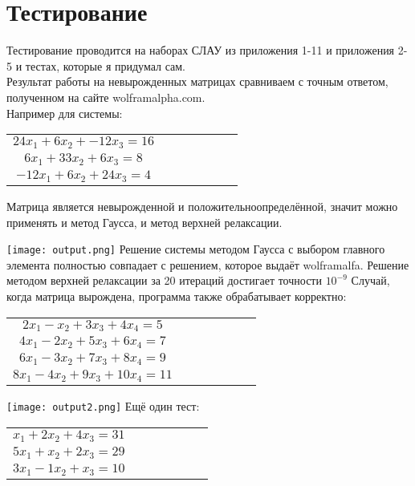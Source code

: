 \documentclass[a4paper,12pt,titlepage,finall]{article}
\begin{document}
\section{Тестирование}

Тестирование проводится на наборах СЛАУ из приложения 1-11 и приложения 2-5 и тестах, которые я придумал сам. \\
Результат работы на невырожденных матрицах сравниваем с точным ответом, полученном на сайте wolframalpha.com.\\

Например для системы:
\begin{tabular}{ccccccc}

$ 24x_1 + 6x_2 + -12x_3 = 16 $\\
$ 6x_1 + 33x_2 + 6x_3 = 8 $\\
$ -12x_1 + 6x_2 + 24x_3 = 4 $\\

\end{tabular}

Матрица является невырожденной и положительноопределённой, значит можно применять и метод Гаусса, и метод верхней релаксации.

\texttt{[image: output.png]}
Решение системы методом Гаусса с выбором главного элемента полностью совпадает с решением, которое выдаёт wolframalfa. Решение методом верхней релаксации за 20 итераций достигает точности $10^{-9}$
\newpage
Случай, когда матрица вырождена, программа также обрабатывает корректно:

\begin{tabular}{ccccccc}

$ 2x_1 - x_2 + 3x_3 +4x_4 = 5 $\\
$ 4x_1 - 2x_2 + 5x_3 + 6x_4 = 7 $\\
$ 6x_1 - 3x_2 + 7x_3 + 8x_4 = 9 $\\
$ 8x_1 - 4x_2 + 9x_3 + 10x_4 = 11 $\\


\end{tabular}

\texttt{[image: output2.png]}
\newpage
Ещё один тест:
\begin{tabular}{ccccccc}

$ x_1 + 2x_2 + 4x_3 = 31 $\\
$ 5x_1 + x_2 + 2x_3 = 29 $\\
$ 3x_1 - 1x_2 + x_3 = 10 $\\

\end{tabular}
\end{document}
